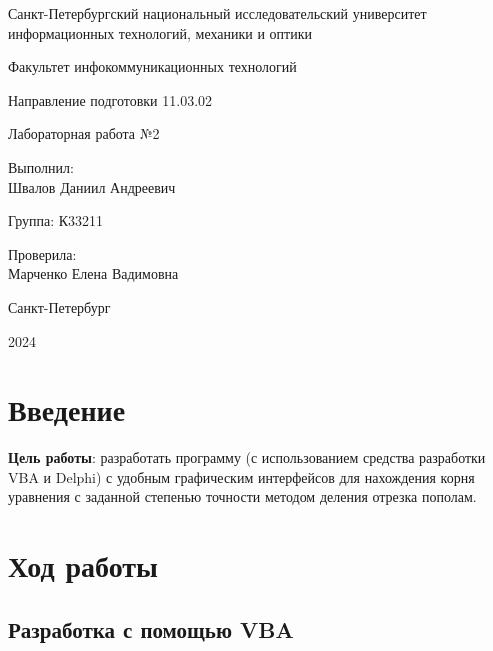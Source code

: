 \documentclass[a4paper, 14pt]{extarticle}
\begin{document}
\begin{titlepage}
  \vspace{0pt plus2fill}
  \noindent

  \vspace{0pt plus6fill}
  \begin{center}
    Санкт-Петербургский национальный исследовательский университет
    информационных технологий, механики и оптики

    \vspace{0pt plus3fill}

    Факультет инфокоммуникационных технологий

    Направление подготовки 11.03.02

    \vspace{0pt plus2fill}

    Лабораторная работа №2
  \end{center}

  \vspace{0pt plus6fill}
  \begin{flushright}
    Выполнил: \\
    Швалов Даниил Андреевич

    Группа: К33211

    Проверила: \\
    Марченко Елена Вадимовна
  \end{flushright}

  \vspace{0pt plus5fill}
  \begin{center}
    Санкт-Петербург

    2024
  \end{center}
\end{titlepage}

\section{Введение}

\textbf{Цель работы}: разработать программу (с использованием средства
разработки VBA и Delphi) с удобным графическим интерфейсов для нахождения корня
уравнения с заданной степенью точности методом деления отрезка пополам.

\section{Ход работы}

\subsection{Разработка с помощью VBA}
\end{document}
